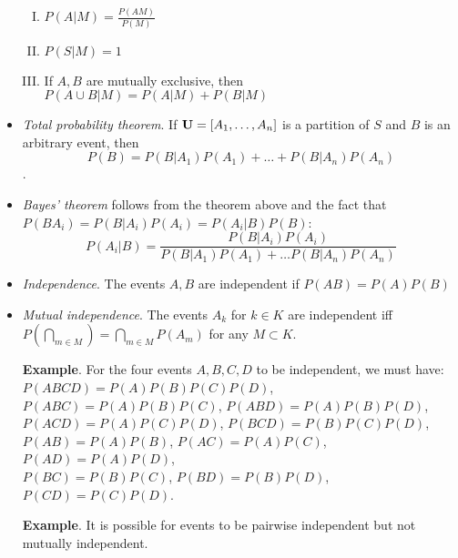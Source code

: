 \documentclass[a4paper, oneside]{book}
\begin{document}
\begin{itemize}
	\begin{enumerate}[I.]
	\item $P(A|M) = \frac{P(AM)}{P(M)}$
	\item $P(S|M)=1$
	\item If $A,B$ are mutually exclusive, then $P(A\cup B | M) = P(A|M)+P(B|M)$
	\end{enumerate}
\item \textit{Total probability theorem}. If $\mathbf U = [ A_1, \hdots, A_n]$ is a partition of $S$ and $B$ is an arbitrary event, then $$P(B)=P(B|A_1)P(A_1)+\hdots+P(B|A_n)P(A_n)$$.
\item \textit{Bayes' theorem} follows from the theorem above and the fact that $P(BA_i)=P(B|A_i)P(A_i)=P(A_i|B)P(B)$: $$P(A_i|B) = \frac{P(B|A_i)P(A_i)}{P(B|A_1)P(A_1) + \hdots P(B|A_n)P(A_n)}$$
\item \textit{Independence}. The events $A,B$ are independent if $P(AB) = P(A)P(B)$
\item \textit{Mutual independence}. The events $A_k$ for $k\in K$ are independent iff $P(\bigcap_{m\in M})=\bigcap_{m\in M}P(A_m)$ for any $M\subset K$.

\textbf{Example}. For the four events $A,B,C,D$ to be independent, we must have:\\%
$P(ABCD)=P(A)P(B)P(C)P(D)$,  \\
$P(ABC)=P(A)P(B)P(C)$,  $P(ABD)=P(A)P(B)P(D)$, \\
$P(ACD)=P(A)P(C)P(D)$,  $P(BCD)=P(B)P(C)P(D)$, \\
$P(AB)=P(A)P(B)$, $P(AC)=P(A)P(C)$, $P(AD)=P(A)P(D)$, \\
$P(BC)=P(B)P(C)$, $P(BD)=P(B)P(D)$, $P(CD)=P(C)P(D)$.

\textbf{Example}. It is possible for events to be pairwise independent but not mutually independent.

\end{itemize}











\end{document}
